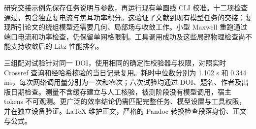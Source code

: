 \hypertarget{auto.07.handoff}{}
研究交接示例先保存任务说明与参数，再运行现有单圆线 CLI 校准。十二项检查通过，包含独立复电流与焦耳功率积分。这验证了文献到现有模型任务的交接；复现所引论文的绕组模型还需要几何、局部场与收敛工作。小型 Maxwell 重跑通过端口电流和功率检查，仍保留单网格限制。工具调用成功及这些局部物理检查尚不能支持收敛后的 Litz 性能排名。

\hypertarget{auto.07.evaluation}{}
三组配对试验针对同一 DOI，使用相同的确定性校验器与权限，对照实时 Crossref 查询和经哈希核验的当日记录复用。耗时中位数分别为 1.102 s 和 0.344 ms，每次网络调用量分别为一次和零次；六次试验均通过 DOI、题名、作者及出版日期检查。测量不含缓存建立与人工核验，被测阶段没有模型调用，宿主 tokens 不可观测。更广泛的效率结论仍需匹配完整任务、模型设置与工具权限，并在独立设备验证。LaTeX 维护正文，严格的 Pandoc 转换检查段落身份、正文与公式。
